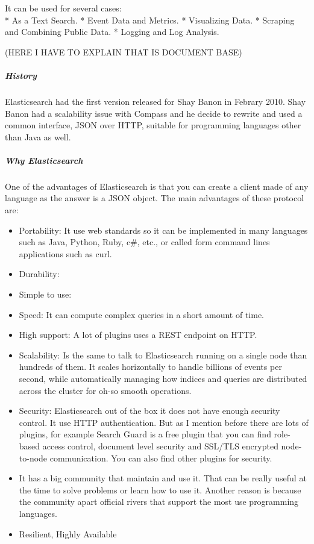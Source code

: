\documentclass[]{article}
\let\oldsubparagraph\subparagraph
\renewcommand{\subparagraph}[1]{\oldsubparagraph{#1}\mbox{}}
\begin{document}
It can be used for several cases:\\
* As a Text Search. * Event Data and Metrics. * Visualizing Data. *
Scraping and Combining Public Data. * Logging and Log Analysis.

(HERE I HAVE TO EXPLAIN THAT IS DOCUMENT BASE)

\hypertarget{history}{%
\subparagraph{History}\label{history}}

Elasticsearch had the first version released for Shay Banon in Febrary
2010. Shay Banon had a scalability issue with Compass and he decide to
rewrite and used a common interface, JSON over HTTP, suitable for
programming languages other than Java as well.

\hypertarget{why-elasticsearch}{%
\subparagraph{Why Elasticsearch}\label{why-elasticsearch}}

One of the advantages of Elasticsearch is that you can create a client
made of any language as the answer is a JSON object. The main advantages
of these protocol are:

\begin{itemize}
\item
  Portability: It use web standards so it can be implemented in many
  languages such as Java, Python, Ruby, c\#, etc., or called form
  command lines applications such as curl.
\item
  Durability:
\item
  Simple to use:
\item
  Speed: It can compute complex queries in a short amount of time.
\item
  High support: A lot of plugins uses a REST endpoint on HTTP.
\item
  Scalability: Is the same to talk to Elasticsearch running on a single
  node than hundreds of them. It scales horizontally to handle billions
  of events per second, while automatically managing how indices and
  queries are distributed across the cluster for oh-so smooth
  operations.
\item
  Security: Elasticsearch out of the box it does not have enough
  security control. It use HTTP authentication. But as I mention before
  there are lots of plugins, for example Search Guard is a free plugin
  that you can find role-based access control, document level security
  and SSL/TLS encrypted node-to-node communication. You can also find
  other plugins for security.
\item
  It has a big community that maintain and use it. That can be really
  useful at the time to solve problems or learn how to use it. Another
  reason is because the community apart official rivers that support the
  most use programming languages.
\item
  Resilient, Highly Available
\end{itemize}
\end{document}
